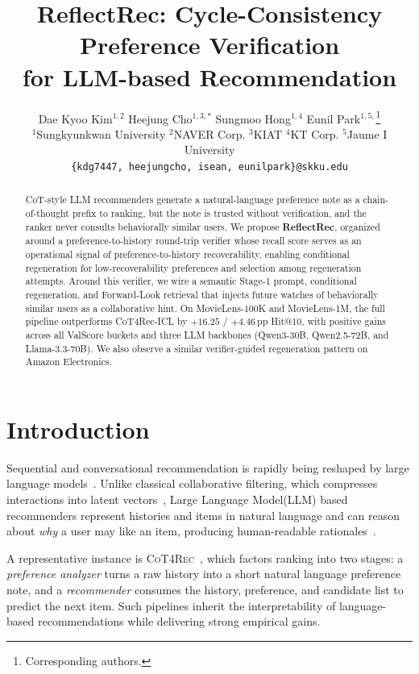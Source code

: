 \documentclass[11pt]{article}
\title{ReflectRec: Cycle-Consistency Preference Verification\\
for LLM-based Recommendation}
\author{
  Dae Kyoo Kim$^{1,2}$ \quad 
  Heejung Cho$^{1,3,*}$ \quad 
  Sungmoo Hong$^{1,4}$ \quad 
  Eunil Park$^{1,5,}$\thanks{Corresponding authors.} \\
  $^1$Sungkyunkwan University  \quad
  $^2$NAVER Corp.  \quad
  $^3$KIAT  \quad
  $^4$KT Corp. \quad
  $^5$Jaume I University \\
  \texttt{\{kdg7447, heejungcho, isean, eunilpark\}@skku.edu}
}
\begin{document}
\maketitle

\begin{abstract}
CoT-style LLM recommenders generate a natural-language preference note as a chain-of-thought prefix to ranking, but the note is trusted without verification, and the ranker never consults behaviorally similar users. We propose \textbf{ReflectRec}, organized around a preference-to-history round-trip verifier whose recall score serves as an operational signal of preference-to-history recoverability, enabling conditional regeneration for low-recoverability preferences and selection among regeneration attempts. Around this verifier, we wire a semantic Stage-1 prompt, conditional regeneration, and Forward-Look retrieval that injects future watches of behaviorally similar users as a collaborative hint. On MovieLens-100K and MovieLens-1M, the full pipeline outperforms CoT4Rec-ICL by $+16.25$ / $+4.46$\,pp Hit@10, with positive gains across all ValScore buckets and three LLM backbones (Qwen3-30B, Qwen2.5-72B, and Llama-3.3-70B). We also observe a similar verifier-guided regeneration pattern on Amazon Electronics.
\end{abstract}

\section{Introduction}
\label{sec:intro}
Sequential and conversational recommendation is rapidly being reshaped by large language models~\citep{geng2022p5,hou2023zeroshot,zhang2023collm,wu2024survey}. Unlike classical collaborative filtering, which compresses interactions into latent vectors~\citep{koren2009mf,rendle2009bpr}, Large Language Model(LLM) based recommenders represent histories and items in natural language and can reason about \emph{why} a user may like an item, producing human-readable rationales~\citep{wei2022cot,bao2023tallrec,gao2023chatrec,wang2025rallrecplus}.

A representative instance is \textsc{CoT4Rec}~\citep{cot4rec2025}, which factors ranking into two stages: a \emph{preference analyzer} turns a raw history into a short natural language preference note, and a \emph{recommender} consumes the history, preference, and candidate list to predict the next item. Such pipelines inherit the interpretability of language-based recommendations while delivering strong empirical gains.
\end{document}
